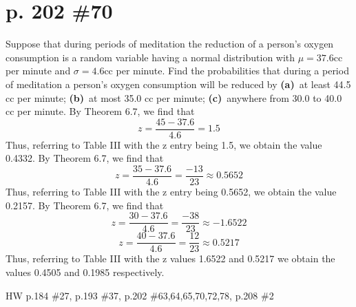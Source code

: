 \documentclass[12pt]{article}
\begin{document}
	\section[20pt]{p. 202 \#70}
	Suppose that during periods of meditation the reduction of a person's oxygen consumption is a random variable having a normal distribution with \(\mu=37.6\)cc per minute and \(\sigma=4.6\)cc per minute. Find the probabilities that during a period of meditation a person's oxygen consumption will be reduced by \newline
	\textbf{(a)}\ at least 44.5 cc per minute; \newline
	\textbf{(b)}\ at most 35.0 cc per minute; \newline
	\textbf{(c)}\ anywhere from 30.0 to 40.0 cc per minute.
	\newline \newline
	By Theorem 6.7, we find that
	\[z=\frac{45-37.6}{4.6}=1.5\]
	Thus, referring to Table III with the z entry being 1.5, we obtain the value 0.4332. \newline
	 \newline \newline
	By Theorem 6.7, we find that
	\[z=\frac{35-37.6}{4.6}=\frac{-13}{23}\approx 0.5652\]
	Thus, referring to Table III with the z entry being 0.5652, we obtain the value 0.2157. \newline
	 \newline \newline
	By Theorem 6.7, we find that
	\[z=\frac{30-37.6}{4.6}=\frac{-38}{23}\approx -1.6522\]
	\[z=\frac{40-37.6}{4.6}=\frac{12}{23}\approx 0.5217\]
	Thus, referring to Table III with the z values 1.6522 and 0.5217 we obtain the values 0.4505 and 0.1985 respectively. \newline
	\newpage
	\maketitle HW p.184 \#27, p.193 \#37, p.202 \#63,64,65,70,72,78, p.208 \#2
\end{document}
